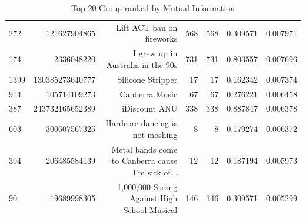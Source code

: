 \begin{table}
\begin{tabular}{| >{\small}l | >{\small}r | >{\small}r | >{\small}r | >{\small}r | >{\small}r |>{\small}r |}
272  &     121627904865 &                          Lift ACT ban on fireworks &   568 &      568 &             0.309571 &            0.007971 \\
174  &       2336048220 &                  I grew up in Australia in the 90s &   731 &      731 &             0.803557 &            0.007696 \\
1399 &  130385273640777 &                                  Silicone Stripper &    17 &       17 &             0.162342 &            0.007374 \\
914  &     105714109273 &                                     Canberra Music &    67 &       67 &             0.276221 &            0.006458 \\
387  &  243732165652389 &                                      iDiscount ANU &   338 &      338 &             0.887847 &            0.006378 \\
603  &     300607567325 &                    Hardcore dancing is not moshing &     8 &        8 &             0.179274 &            0.006372 \\
394  &     206485584139 &  Metal bands come to Canberra cause I'm sick of... &    12 &       12 &             0.187194 &            0.005973 \\
90   &      19689998305 &       1,000,000 Strong Against High School Musical &   146 &      146 &             0.309571 &            0.005299 \\
\hline
\end{tabular}
\caption{Top 20 Group ranked by Mutual Information}
\label {Top 20 Group ranked by Mutual Information}
\end{table}


